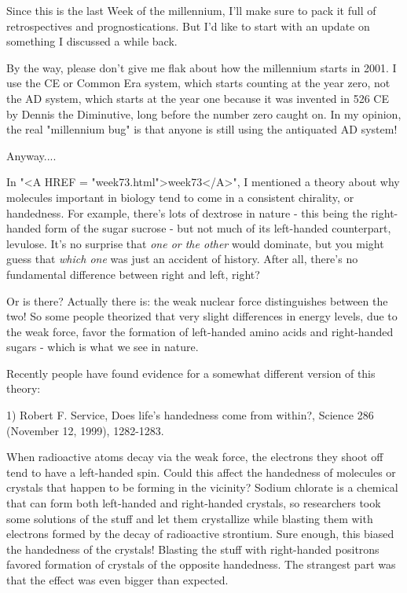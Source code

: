 

Since this is the last Week of the millennium, I'll make sure to
pack it full of retrospectives and prognostications.  But I'd like 
to start with an update on something I discussed a while back.

By the way, please don't give me flak about how the millennium starts in
2001.  I use the CE or Common Era system, which starts counting at the
year zero, not the AD system, which starts at the year one because it
was invented in 526 CE by Dennis the Diminutive, long before the number 
zero caught on.  In my opinion, the real "millennium bug" is 
that anyone is still using the antiquated AD system!  

Anyway....

In "<A HREF = "week73.html">week73</A>", I mentioned a theory about why molecules important in
biology tend to come in a consistent chirality, or handedness.   For
example, there's lots of dextrose in nature - this being the right-handed 
form of the sugar sucrose - but not much of its left-handed counterpart,
levulose.  It's no surprise that \emph{one or the other} would dominate, but
you might guess that \emph{which one} was just an accident of history.  After
all, there's no fundamental difference between right and left, right?

Or is there?  Actually there is: the weak nuclear force distinguishes
between the two!  So some people theorized that very slight differences
in energy levels, due to the weak force, favor the formation of
left-handed amino acids and right-handed sugars - which is what we see
in nature.  

Recently people have found evidence for a somewhat different version of
this theory:

1) Robert F. Service, Does life's handedness come from within?, 
Science 286 (November 12, 1999), 1282-1283.

When radioactive atoms decay via the weak force, the electrons they
shoot off tend to have a left-handed spin.  Could this affect the
handedness of molecules or crystals that happen to be forming in the
vicinity?  Sodium chlorate is a chemical that can form both left-handed
and right-handed crystals, so researchers took some solutions of the 
stuff and let them crystallize while blasting them with electrons formed
by the decay of radioactive strontium.  Sure enough, this biased the
handedness of the crystals!  Blasting the stuff with right-handed
positrons favored formation of crystals of the opposite handedness.  
The strangest part was that the effect was even bigger than expected.

